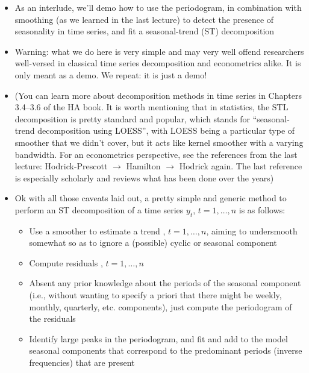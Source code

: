 \documentclass{article}
\begin{document}
\begin{itemize}
\item As an interlude, we'll demo how to use the periodogram, in combination
  with smoothing (as we learned in the last lecture) to detect the presence of 
  seasonality in time series, and fit a seasonal-trend (ST) decomposition 

\item Warning: what we do here is very simple and may very well offend
  researchers well-versed in classical time series decomposition and
  econometrics alike. It is only meant as a demo. We repeat: it is just a demo! 

\item (You can learn more about decomposition methods in time series in Chapters 
  3.4--3.6 of the HA book. It is worth mentioning that in statistics, the STL
  decomposition is pretty standard and popular, which stands for
  ``seasonal-trend decomposition using LOESS'', with LOESS being a particular
  type of smoother that we didn't cover, but it acts like kernel smoother with a
  varying bandwidth. For an econometrics perspective, see the references from
  the last lecture: Hodrick-Prescott $\to$ Hamilton $\to$ Hodrick again. The
  last reference is especially scholarly and reviews what has been done over the
  years)

\item Ok with all those caveats laid out, a pretty simple and generic method to
  perform an ST decomposition of a time series $y_t$, $t = 1,\dots,n$ is as
  follows:    
  \begin{itemize}
  \item Use a smoother to estimate a trend , $t = 1,\dots,n$,
    aiming to undersmooth somewhat so as to ignore a (possible) cyclic or
    seasonal component 

  \item Compute residuals , $t = 1,\dots,n$

  \item Absent any prior knowledge about the periods of the seasonal component 
    (i.e., without wanting to specify a priori that there might be weekly,
    monthly, quarterly, etc. components), just compute the periodogram of the
    residuals

\item Identify large peaks in the periodogram, and fit and add to the model
  seasonal components that correspond to the predominant periods (inverse 
  frequencies) that are present  
  \end{itemize}


\end{itemize}
\end{document}
